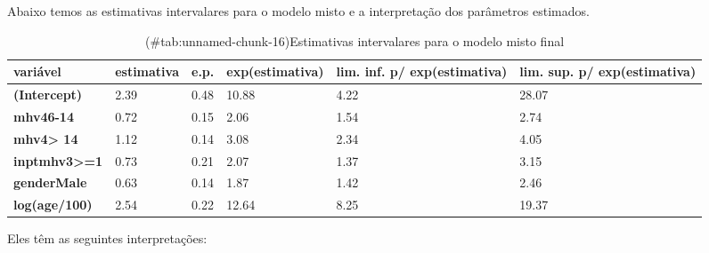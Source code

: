 \documentclass[
  11pt,
]{article}
\begin{document}
Abaixo temos as estimativas intervalares para o modelo misto e a interpretação dos parâmetros estimados.

\begin{table}

\caption{(\#tab:unnamed-chunk-16)Estimativas intervalares para o modelo misto final}
\centering
\fontsize{12}{14}\selectfont
\begin{tabu} to 
\toprule
variável & estimativa & e.p. & exp(estimativa) & lim. inf. p/ exp(estimativa) & lim. sup. p/ exp(estimativa)\\
\midrule
\textbf{(Intercept)} & 2.39 & 0.48 & 10.88 & 4.22 & 28.07\\
\textbf{mhv46-14} & 0.72 & 0.15 & 2.06 & 1.54 & 2.74\\
\textbf{mhv4> 14} & 1.12 & 0.14 & 3.08 & 2.34 & 4.05\\
\textbf{inptmhv3>=1} & 0.73 & 0.21 & 2.07 & 1.37 & 3.15\\
\textbf{genderMale} & 0.63 & 0.14 & 1.87 & 1.42 & 2.46\\
\addlinespace
\textbf{log(age/100)} & 2.54 & 0.22 & 12.64 & 8.25 & 19.37\\
\bottomrule
\end{tabu}
\end{table}

Eles têm as seguintes interpretações:
\end{document}
